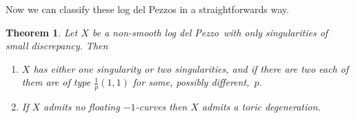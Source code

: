 \documentclass[11pt]{amsbook}
\theoremstyle{plain}
\newtheorem{thm}{Theorem}[section]
\newcommand{\ldp}{log del Pezzo}
\begin{document}
Now we can classify these log del Pezzos in a straightforwards way. 
\begin{thm}\label{ThmOnSing}
Let $X$ be a non-smooth \ldp\ with only singularities of small discrepancy. Then 
\begin{enumerate}
\item\label{thm38i}
$X$ has either one singularity or two singularities, and if there are two each of them are of type $\frac{1}p(1,1)$ for some, possibly different,~$p$.
\item\label{thm38ii}
If $X$ admits no floating $-1$-curves then $X$ admits a toric degeneration. %
\end{enumerate}
\end{thm}
\end{document}
